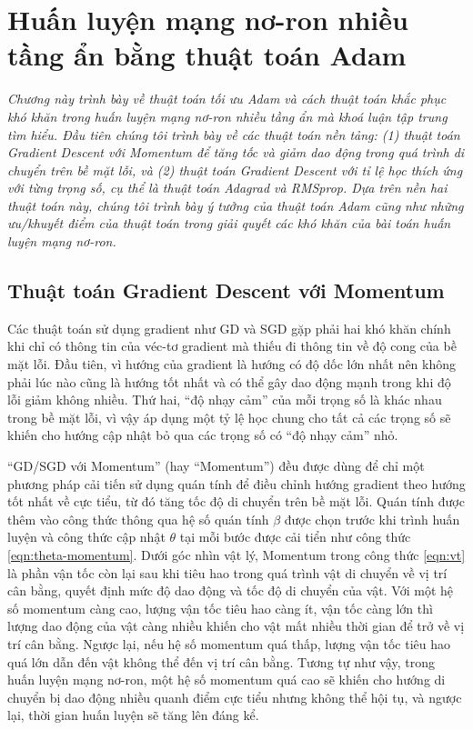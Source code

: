 \chapter{Huấn luyện mạng nơ-ron nhiều tầng ẩn bằng thuật toán Adam}
\label{Chapter3}

\textit{Chương này trình bày về thuật toán tối ưu Adam và cách thuật toán khắc phục khó khăn trong huấn luyện mạng nơ-ron nhiều tầng ẩn mà khoá luận tập trung tìm hiểu. Đầu tiên chúng tôi trình bày về các thuật toán nền tảng: (1) thuật toán Gradient Descent với Momentum để tăng tốc và giảm dao động trong quá trình di chuyển trên bề mặt lỗi, và (2) thuật toán Gradient Descent với tỉ lệ học thích ứng với từng trọng số, cụ thể là thuật toán Adagrad và RMSprop. Dựa trên nền hai thuật toán này, chúng tôi trình bày ý tưởng của thuật toán Adam cũng như những ưu/khuyết điểm của thuật toán trong giải quyết các khó khăn của bài toán huấn luyện mạng nơ-ron.}

\section{Thuật toán Gradient Descent với Momentum}

Các thuật toán sử dụng gradient như GD và SGD gặp phải hai khó khăn chính khi chỉ có thông tin của véc-tơ gradient mà thiếu đi thông tin về độ cong của bề mặt lỗi. Đầu tiên, vì hướng của gradient là hướng có độ dốc lớn nhất nên không phải lúc nào cũng là hướng tốt nhất và có thể gây dao động mạnh trong khi độ lỗi giảm không nhiều. Thứ hai, ``độ nhạy cảm'' của mỗi trọng số là khác nhau trong bề mặt lỗi, vì vậy áp dụng một tỷ lệ học chung cho tất cả các trọng số sẽ khiến cho hướng cập nhật bỏ qua các trọng số có ``độ nhạy cảm'' nhỏ.

``GD/SGD với Momentum'' (hay ``Momentum'') đều được dùng để chỉ một phương pháp cải tiến sử dụng quán tính để điều chỉnh hướng gradient theo hướng tốt nhất về cực tiểu, từ đó tăng tốc độ di chuyển trên bề mặt lỗi. Quán tính được thêm vào công thức thông qua hệ số quán tính $\beta$ được chọn trước khi trình huấn luyện và công thức cập nhật $\theta$ tại mỗi bước được cải tiển như công thức \ref{eqn:theta-momentum}. Dưới góc nhìn vật lý, Momentum trong công thức \ref{eqn:vt} là phần vận tốc còn lại sau khi tiêu hao trong quá trình vật di chuyển về vị trí cân bằng, quyết định mức độ dao động và tốc độ di chuyển của vật. Với một hệ số momentum càng cao, lượng vận tốc tiêu hao càng ít, vận tốc càng lớn thì lượng dao động của vật càng nhiều khiến cho vật mất nhiều thời gian để trở về vị trí cân bằng. Ngược lại, nếu hệ số momentum quá thấp, lượng vận tốc tiêu hao quá lớn dẫn đến vật không thể đến vị trí cân bằng. Tương tự như vậy, trong huấn luyện mạng nơ-ron, một hệ số momentum quá cao sẽ khiến cho hướng di chuyển bị dao động nhiều quanh điểm cực tiểu nhưng không thể hội tụ, và ngược lại, thời gian huấn luyện sẽ tăng lên đáng kể.

